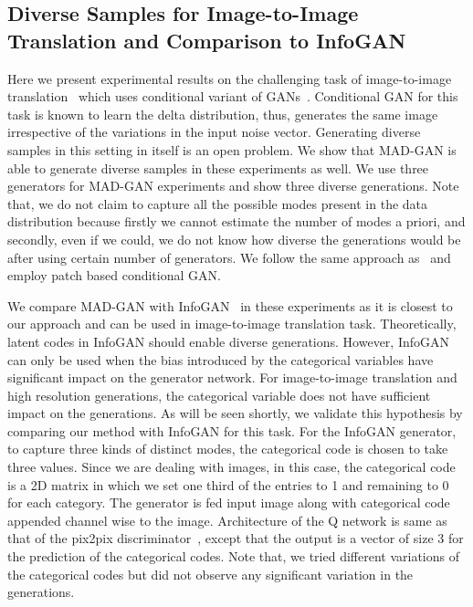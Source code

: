 \subsection{Diverse Samples for Image-to-Image Translation and Comparison to InfoGAN}
Here we present experimental results on the challenging task of image-to-image translation~\cite{isola2016image2image} which uses conditional variant of GANs~\cite{mirza2014conditional}. Conditional GAN for this task is known to learn the delta distribution, thus, generates the same image irrespective of the variations in the input noise vector. Generating diverse samples in this setting in itself is an open problem. We show that MAD-GAN is able to generate diverse samples in these experiments as well. We use three generators for MAD-GAN experiments and show three diverse generations. Note that, we do not claim to capture all the possible modes present in the data distribution because firstly we cannot estimate the number of modes a priori, and secondly, even if we could, we do not know how diverse the generations would be after using certain number of generators. 
We follow the same approach as~\cite{isola2016image2image} and employ patch based conditional GAN. 

We compare MAD-GAN with InfoGAN~\cite{chen2016infogan} in these experiments as it is closest to our approach and can be used in image-to-image translation task. Theoretically, latent codes in InfoGAN should enable diverse generations. However, InfoGAN can only be used when the bias introduced by the categorical variables have significant impact on the generator network. For image-to-image translation and high resolution generations, the categorical variable does not have sufficient impact on the generations. As will be seen shortly, we validate this hypothesis by comparing our method with InfoGAN for this task. 
For the InfoGAN generator, to capture three kinds of distinct modes, the categorical code is chosen to take three values. Since we are dealing with images, in  this case, the categorical code is a 2D matrix in which we set one third of the entries to 1 and remaining to 0 for each category. The generator is fed input image along with categorical code appended channel wise to the image. Architecture of the Q network is same as that of the pix2pix discriminator~\cite{isola2016image2image}, except that the output is a vector of size $3$ for the prediction of the categorical codes. Note that, we tried different variations of the categorical codes but did not observe any significant variation in the generations.

